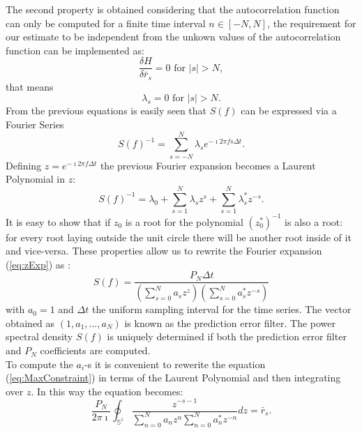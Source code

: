 \documentclass[twocolumn,showpacs,preprintnumbers,nofootinbib,prd,
superscriptaddress,10pt]{revtex4-1}
\begin{document}
The second property is obtained considering that the autocorrelation function can only be computed for a finite time interval $n \in [-N, N]$, the requirement for our estimate to be independent from the unkown values of the autocorrelation function can be implemented as:  
\begin{equation}\nonumber 
    \frac{\delta H}{\delta \bar r_s} = 0 \text{ for } \vert s \vert > N,
\end{equation}
that means 
\begin{equation}
\nonumber 
\lambda_s = 0 \text{ for } \vert s \vert > N. 
\end{equation}
From the previous equations is easily seen that $S(f)$ can be expressed via a Fourier Series 
\begin{equation}\label{eq:PSDconstraint}
    S(f)^{-1} = \sum_{s = -N}^N \lambda_s e^{-\imath 2 \pi f s \Delta t}.
\end{equation}
Defining $z = e^{-\imath 2 \pi f \Delta t}$ the previous Fourier expansion becomes a Laurent Polynomial in $z$: 
\begin{equation}
    \label{eq:zExp}
    S(f)^{-1} = \lambda_0 + \sum_{s = 1}^N \lambda_s z^s + \sum_{s = 1}^N \lambda^*_s z^{-s}.
\end{equation}
It is easy to show that if $z_0$ is a root for the polynomial $(z_0^*)^{-1}$ is also a root: for every root laying outside the unit circle there will be another root inside of it and vice-versa. These properties allow us to rewrite the Fourier expansion (\ref{eq:zExp}) as \cite{1975STIN...7714318B}:
\begin{equation}\label{eq:MESApsd_appendix}
    S(f) = \frac{P_N \Delta t}{\left(\sum_{s=0}^N a_s z^z\right)\left(\sum_{s = 0}^N a^*_s z^{-s}\right)}
\end{equation}
with $a_0 = 1$ and $\Delta t$ the uniform sampling interval for the time series. The vector obtained as $(1, a_1, \dots, a_N)$ is known as the prediction error filter. The power spectral density $S(f)$ is uniquely determined if both the prediction error filter and $P_N$ coefficients are computed. \\
To compute the $a_i$-s it is convenient to rewerite the equation 
(\ref{eq:MaxConstraint}) in terms of the Laurent Polynomial and then integrating over $z$. In this way the equation becomes:
\begin{equation}
   \frac{P_N}{2 \pi \imath} \oint _{\mathbb S^1}\frac{z^{-s - 1}}{\sum_{n = 0}^N a_n z^n \sum_{n = 0}^N a^*_n z^{-n}}dz = \bar r_s. 
\end{equation}
\end{document}
